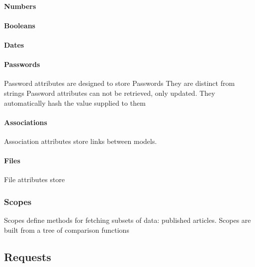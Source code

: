 \documentclass[
  12pt,
]{article}
\let\oldparagraph\paragraph
\renewcommand{\paragraph}[1]{\oldparagraph{#1}\mbox{}}
\begin{document}
\hypertarget{numbers}{%
\paragraph{Numbers}\label{numbers}}

\hypertarget{booleans}{%
\paragraph{Booleans}\label{booleans}}

\hypertarget{dates}{%
\paragraph{Dates}\label{dates}}

\hypertarget{passwords}{%
\paragraph{Passwords}\label{passwords}}

Password attributes are designed to store Passwords They are distinct
from strings Password attributes can not be retrieved, only updated.
They automatically hash the value supplied to them

\hypertarget{associations}{%
\paragraph{Associations}\label{associations}}

Association attributes store links between models.

\hypertarget{files}{%
\paragraph{Files}\label{files}}

File attributes store

\hypertarget{scopes}{%
\subsubsection{Scopes}\label{scopes}}

Scopes define methods for fetching subsets of data: published articles.
Scopes are built from a tree of comparison functions

\hypertarget{requests}{%
\subsection{Requests}\label{requests}}
\end{document}
